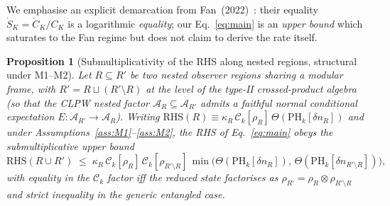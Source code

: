 \documentclass[aps,prd,superscriptaddress,nofootinbib,floatfix,10pt]{revtex4-2}
\newtheorem{proposition}{Proposition}
\theoremstyle{remark}
\newcommand{\kR}{\kappa_{R}}
\newcommand{\Ck}{\mathcal{C}_{k}}
\newcommand{\PHk}{\mathrm{PH}_{k}}
\newcommand{\dn}{\delta n}
\newcommand{\AR}{\mathcal{A}_{R}}
\begin{document}
We emphasise an explicit demarcation from
Fan~(2022)~\cite{Fan2022}: their equality $\dot S_{K} = \dot C_{K}/C_{K}$
is a logarithmic \emph{equality}; our Eq.~\eqref{eq:main} is an
\emph{upper bound} which saturates to the Fan regime but does not
claim to derive the rate itself.

\begin{proposition}[Submultiplicativity of the RHS along nested regions, structural under M1--M2]
\label{lem:submult}
Let $R \subseteq R'$ be two nested observer regions sharing a modular
frame, with $R' = R \sqcup (R'\setminus R)$ at the level of the
type-II crossed-product algebra (so that the CLPW nested factor
$\AR \subseteq \mathcal{A}_{R'}$ admits a faithful normal conditional
expectation $E : \mathcal{A}_{R'}\to\AR$). Writing
$\mathrm{RHS}(R) \equiv \kR\,\Ck[\rho_{R}]\,\Theta(\PHk[\dn_{R}])$ and
under Assumptions~\ref{ass:M1}--\ref{ass:M2}, the RHS of
Eq.~\eqref{eq:main} obeys the submultiplicative upper bound
\begin{equation}
 \mathrm{RHS}(R\cup R')
 \;\le\;
 \kR\,\Ck[\rho_{R}]\,\Ck[\rho_{R'\setminus R}]\,
 \min\!\Big(\Theta(\PHk[\dn_{R}]),\,\Theta(\PHk[\dn_{R'\setminus R}])\Big),
 \label{eq:submult}
\end{equation}
with equality in the $\Ck$ factor iff the reduced state factorises as
$\rho_{R'} = \rho_{R}\otimes\rho_{R'\setminus R}$ and strict inequality
in the generic entangled case.
\end{proposition}
\end{document}
